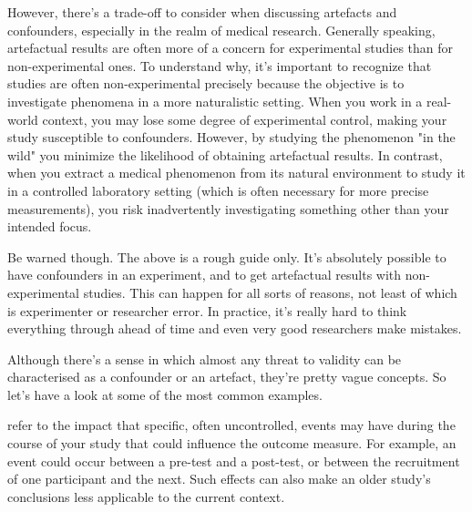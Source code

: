 However, there's a trade-off to consider when discussing artefacts and confounders, especially in the realm of medical research. Generally speaking, artefactual results are often more of a concern for experimental studies than for non-experimental ones. To understand why, it's important to recognize that studies are often non-experimental precisely because the objective is to investigate phenomena in a more naturalistic setting. When you work in a real-world context, you may lose some degree of experimental control, making your study susceptible to confounders. However, by studying the phenomenon "in the wild" you minimize the likelihood of obtaining artefactual results. In contrast, when you extract a medical phenomenon from its natural environment to study it in a controlled laboratory setting (which is often necessary for more precise measurements), you risk inadvertently investigating something other than your intended focus. 

Be warned though. The above is a rough guide only. It's absolutely possible to have confounders in an experiment, and to get artefactual results with non-experimental studies. This can happen for all sorts of reasons, not least of which is experimenter or researcher error. In practice, it's really hard to think everything through ahead of time and even very good researchers make mistakes. 

Although there's a sense in which almost any threat to validity can be characterised as a confounder or an artefact, they're pretty vague concepts. So let's have a look at some of the most common examples.

 refer to the impact that specific, often uncontrolled, events may have during the course of your study that could influence the outcome measure. For example, an event could occur between a pre-test and a post-test, or between the recruitment of one participant and the next. Such effects can also make an older study's conclusions less applicable to the current context. 

